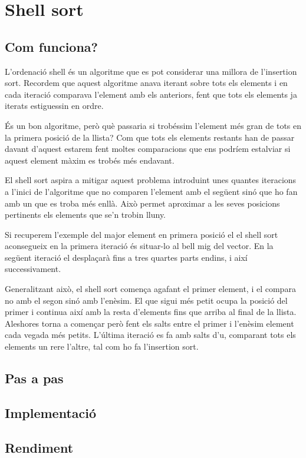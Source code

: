 \chapter{Shell sort}

\section{Com funciona?}
L'ordenació shell és un algoritme que es pot considerar una millora de l'insertion sort.
Recordem que aquest algoritme anava iterant sobre tots els elements i en cada iteració comparava l'element amb els anteriors, fent que tots els elements ja iterats estiguessin en ordre.

És un bon algoritme, però què passaria si trobéssim l'element més gran de tots en la primera posició de la llista?
Com que tots els elements restants han de passar davant d'aquest estarem fent moltes comparacions que ens podríem estalviar si aquest element màxim es trobés més endavant.

El shell sort aspira a mitigar aquest problema introduint unes quantes iteracions a l'inici de l'algoritme que no comparen l'element amb el següent sinó que ho fan amb un que es troba més enllà.
Això permet aproximar a les seves posicions pertinents els elements que se'n trobin lluny.

Si recuperem l'exemple del major element en primera posició el el shell sort aconsegueix en la primera iteració és situar-lo al bell mig del vector.
En la següent iteració el desplaçarà fins a tres quartes parts endins, i així successivament.

Generalitzant això, el shell sort comença agafant el primer element, i el compara no amb el segon sinó amb l'enèsim. El que sigui més petit ocupa la posició del primer i continua així amb la resta d'elements fins que arriba al final de la llista. Aleshores torna a començar però fent els salts entre el primer i l'enèsim element cada vegada més petits.
L'última iteració es fa amb salts d'u, comparant tots els elements un rere l'altre, tal com ho fa l'insertion sort.

\section{Pas a pas}

\section{Implementació}


\begin{minipage}{\textwidth}
	\section{Rendiment}
	\noindent
	\makebox[\textwidth][c]{
		
	}
	\vspace*{1em}
	\begin{center}
		
	\end{center}
\end{minipage}